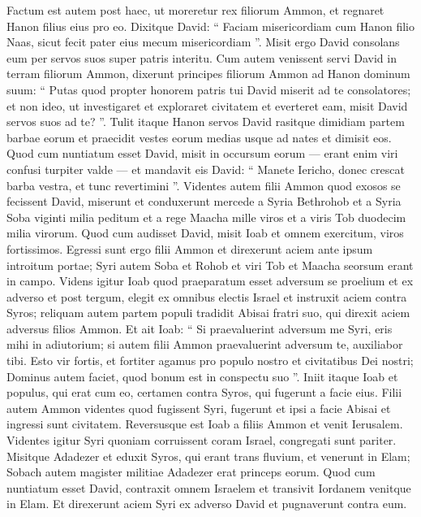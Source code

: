 \begin{biblechapter}
\begin{biblechapter}
\begin{biblechapter}
\begin{biblechapter}
\begin{biblechapter}
\begin{biblechapter}
\begin{biblechapter}
\begin{biblechapter}
\begin{biblechapter}
\begin{biblechapter}
\verse Factum est autem post haec, ut moreretur rex filiorum Ammon, et regnaret Hanon filius eius pro eo. 
\verse Dixitque David: “ Faciam misericordiam cum Hanon filio Naas, sicut fecit pater eius mecum misericordiam ”. Misit ergo David consolans eum per servos suos super patris interitu. Cum autem venissent servi David in terram filiorum Ammon, 
\verse dixerunt principes filiorum Ammon ad Hanon dominum suum: “ Putas quod propter honorem patris tui David miserit ad te consolatores; et non ideo, ut investigaret et exploraret civitatem et everteret eam, misit David servos suos ad te? ”. 
\verse Tulit itaque Hanon servos David rasitque dimidiam partem barbae eorum et praecidit vestes eorum medias usque ad nates et dimisit eos. 
\verse Quod cum nuntiatum esset David, misit in occursum eorum — erant enim viri confusi turpiter valde — et mandavit eis David: “ Manete Iericho, donec crescat barba vestra, et tunc revertimini ”.
 \verse Videntes autem filii Ammon quod exosos se fecissent David, miserunt et conduxerunt mercede a Syria Bethrohob et a Syria Soba viginti milia peditum et a rege Maacha mille viros et a viris Tob duodecim milia virorum. 
\verse Quod cum audisset David, misit Ioab et omnem exercitum, viros fortissimos. 
\verse Egressi sunt ergo filii Ammon et direxerunt aciem ante ipsum introitum portae; Syri autem Soba et Rohob et viri Tob et Maacha seorsum erant in campo. 
\verse Videns igitur Ioab quod praeparatum esset adversum se proelium et ex adverso et post tergum, elegit ex omnibus electis Israel et instruxit aciem contra Syros; 
\verse reliquam autem partem populi tradidit Abisai fratri suo, qui direxit aciem adversus filios Ammon. 
\verse Et ait Ioab: “ Si praevaluerint adversum me Syri, eris mihi in adiutorium; si autem filii Ammon praevaluerint adversum te, auxiliabor tibi. 
\verse Esto vir fortis, et fortiter agamus pro populo nostro et civitatibus Dei nostri; Dominus autem faciet, quod bonum est in conspectu suo ”. 
 \verse Iniit itaque Ioab et populus, qui erat cum eo, certamen contra Syros, qui fugerunt a facie eius. 
\verse Filii autem Ammon videntes quod fugissent Syri, fugerunt et ipsi a facie Abisai et ingressi sunt civitatem. Reversusque est Ioab a filiis Ammon et venit Ierusalem.
 \verse Videntes igitur Syri quoniam corruissent coram Israel, congregati sunt pariter. 
\verse Misitque Adadezer et eduxit Syros, qui erant trans fluvium, et venerunt in Elam; Sobach autem magister militiae Adadezer erat princeps eorum. 
\verse Quod cum nuntiatum esset David, contraxit omnem Israelem et transivit Iordanem venitque in Elam. Et direxerunt aciem Syri ex adverso David et pugnaverunt contra eum. 

\end{biblechapter}
\end{biblechapter}
\end{biblechapter}
\end{biblechapter}
\end{biblechapter}
\end{biblechapter}
\end{biblechapter}
\end{biblechapter}
\end{biblechapter}
\end{biblechapter}
